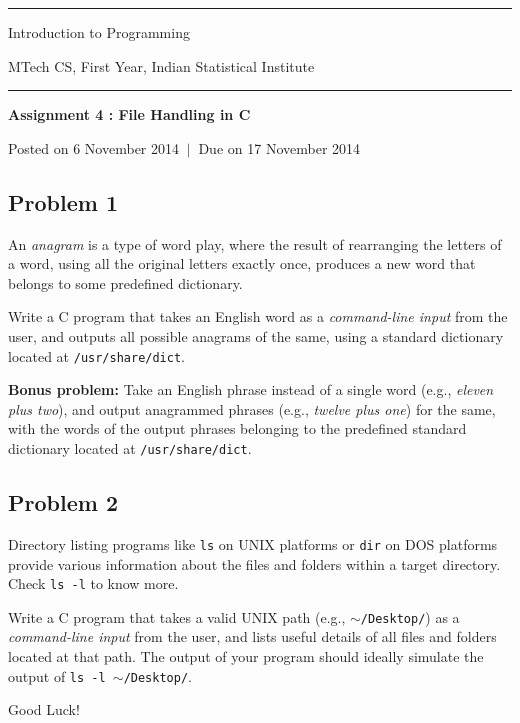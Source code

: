 \documentclass[11pt,a4paper]{article}
\begin{document}
\pagestyle{empty}

\begin{center}
  \hrule
  \vspace*{10pt}
  
  {\huge Introduction to Programming}

  \vspace*{10pt}

  {\large MTech CS, First Year, Indian Statistical Institute}
  
  \vspace*{10pt}  
  \hrule
  \vspace*{20pt}
  
  \textbf{\Large Assignment 4 : File Handling in C}

  Posted on 6 November 2014 $ \ \vert \ $ Due on 17 November 2014

  \vspace*{10pt}
  
\end{center}



\subsection*{Problem 1}

An \emph{anagram} is a type of word play, where the result of rearranging the letters of a word, using all the original letters exactly once, produces a new word that belongs to some predefined dictionary.

Write a C program that takes an English word as a \emph{command-line input} from the user, and outputs all possible anagrams of the same, using a standard dictionary located at \texttt{/usr/share/dict}.


{\flushleft\textbf{Bonus problem:}} Take an English phrase instead of a single word (e.g., \emph{eleven plus two}), and output anagrammed phrases (e.g., \emph{twelve plus one}) for the same, with the words of the output phrases belonging to the predefined standard dictionary located at \texttt{/usr/share/dict}.


\subsection*{Problem 2}

Directory listing programs like \texttt{ls} on UNIX platforms or \texttt{dir} on DOS platforms provide various information about the files and folders within a target directory. Check \texttt{ls -l} to know more.

Write a C program that takes a valid UNIX path (e.g., \texttt{$\sim$/Desktop/}) as a \emph{command-line input} from the user, and lists useful details of all files and folders located at that path. The output of your program should ideally simulate the output of \texttt{ls -l $\sim$/Desktop/}.


\vfill

\hfill Good Luck! {\Large\smiley{}}
\end{document}
